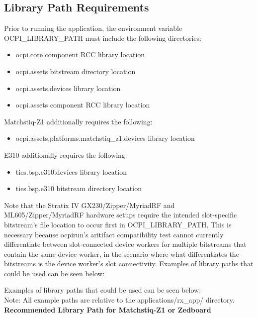\subsection{Library Path Requirements}
\noindent Prior to running the application, the environment variable OCPI\_LIBRARY\_PATH must include the following directories:\par\medskip
	\begin{itemize}
		\item ocpi.core component RCC library location
		\item ocpi.assets bitstream directory location
		\item ocpi.assets.devices library location
		\item ocpi.assets component RCC library location
	\end{itemize}
Matchstiq-Z1 additionally requires the following:
	\begin{itemize}
		\item ocpi.assets.platforms.matchstiq\_z1.devices library location
	\end{itemize}
E310 additionally requires the following:
	\begin{itemize}
		\item ties.bsp.e310.devices library location
		\item ties.bsp.e310 bitstream directory location
	\end{itemize}

\noindent Note that the Stratix IV GX230/Zipper/MyriadRF and ML605/Zipper/MyriadRF hardware setups require the intended slot-specific bitstream's file location to occur first in OCPI\_LIBRARY\_PATH. This is necessary because ocpirun's aritifact compatibility test cannot currently differentiate between slot-connected device workers for multiple bitstreams that contain the same device worker, in the scenario where what differentiates the bitstreams is the device worker's slot connectivity. Examples of library paths that could be used can be seen below:\par\medskip
\pagebreak

\noindent Examples of library paths that could be used can be seen below:\\

Note: All example paths are relative to the applications/rx\_app/ directory.\\

\noindent\textbf{Recommended Library Path for Matchstiq-Z1 or Zedboard}\\

